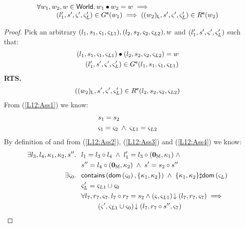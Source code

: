 \begin{lemma}[]\label{lem:extendGContainment}
%
\[
\begin{array}{l}
	\forall w_1, w_2, w \in \textsf{World}.\, w_1 \bullet w_2 = w \implies\\
	\hspace*{1cm}(l'_1, s', \varsigma_{}', \varsigma_{L}') \in G^{\textsf{e}}(w_1) \implies ((w_2)_{\textsf{L}}, s', \varsigma_{}', \varsigma_{L}') \in R^{\textsf{e}}(w_2)
\end{array}
\]
%
\begin{proof} Pick an arbitrary $(l_1, s_1, \varsigma_{1}, \varsigma_{L1}), (l_2, s_2, \varsigma_{2}, \varsigma_{L2}), w$ and $(l'_1, s', \varsigma_{}', \varsigma_{L}')$ such that:
%
\begin{align}
	(l_1, s_1, \varsigma_{1}, \varsigma_{L1}) \bullet (l_2, s_2, \varsigma_{2}, \varsigma_{L2}) = w \label{L12:Ass1}\\
	(l'_1, s', \varsigma_{}', \varsigma_{L}') \in G^{\textsf{e}}(l_1, s_1, \varsigma_{1}, \varsigma_{L1}) \label{L12:Ass2}
\end{align}
%
\textbf{RTS.}
%
\begin{align}
	((w_2)_{\textsf{L}}, s', \varsigma_{}', \varsigma_{L}') \in R^{\textsf{e}}(l_2, s_2, \varsigma_{2}, \varsigma_{L2}) \label{L12:Goal}
\end{align}
From (\ref{L12:Ass1}) we know:
%
\begin{align}
	& s_1 = s_2 \label{L12:Ass3}\\
	& \varsigma_{1} = \varsigma_{2} \;\land\; \varsigma_{L1} = \varsigma_{L2} \label{L12:Ass4}
\end{align}
%
By definition of \extendG and from (\ref{L12:Ass2}), (\ref{L12:Ass3}) and (\ref{L12:Ass4}) we know:
%
\begin{align}
	\exsts{l_3, l_4, \ca{1}, \ca{2}, s''} \hspace*{0.2cm}& l_1 = l_3 \composeL l_4 \;\land\; l'_1 = l_3 \composeL (\unitH, \ca{1}) \;\land \label{L12:Ass5}\\
	& s'' = l_4 \composeL (\unitH, \ca{2}) \;\land\; s' = s_2 \composeL s'' \label{L12:Ass6}\\
%
	\exsts{\amod{0}} \hspace*{0.2cm} & \contains{\dom{\amod{0}}}{\{\ca{1}, \ca{2}\}} \;\land\;  \{\ca{1}, \ca{2}\} \disjoint \dom{\amod{L}} \label{L12:Ass7}\\
%
	& \amod{L}' = \amod{L1} \cup \amod{0} \label{L12:fence}\\
%	
	&\for{l_7, r_7, \amod{7}} l_7 \composeL r_7 = s_2 \land \extendsAM{\amod{}, \amod{L1}}{l_7}{r_7}{\amod{7}} \implies \nonumber\\ 
	&\hspace*{0.8cm}\extendsAM{\amod{}', \amod{L1} \cup \amod{0}}{l_7}{r_7 \composeL s''}{\amod{7}}  \label{L12:Ass9}\\

\end{align}
\end{proof}
\end{lemma}
